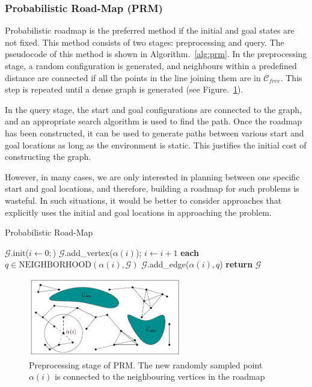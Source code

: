 \subsubsection{Probabilistic Road-Map (PRM)}
Probabilistic roadmap is the preferred method if the initial and goal states are not fixed. This method consists of two stages: preprocessing and query. The pseudocode of this method is shown in Algorithm.~\ref{alg:prm}.
In the preprocessing stage, a random configuration is generated, and neighbours within a predefined distance are connected if all the points in the line joining them are in $\mathcal{C}_{free}$. This step is repeated until a dense graph is generated (see Figure.~\ref{fig:prm}). 

In the query stage, the start and goal configurations are connected to the graph, and an appropriate search algorithm is used to find the path. Once the roadmap has been constructed, it can be used to generate paths between various start and goal locations as long as the environment is static. This justifies the initial cost of constructing the graph. 

However, in many cases, we are only interested in planning between one specific start and goal locations, and therefore, building a roadmap for such problems is wasteful. In such situations, it would be better to consider approaches that explicitly uses the initial and goal locations in approaching the problem.


\begin{algorithm}
\caption{Probabilistic Road-Map}\label{alg:prm}
\begin{algorithmic}[1]
\State $\mathcal{G}$.init($i\gets 0;$)
\State $\mathcal{G}$.add\_vertex($\alpha(i)$); $i\gets i+1$
\For \textbf{each} $q\in \text{NEIGHBORHOOD}(\alpha(i),\mathcal{G})$
\State $\mathcal{G}$.add\_edge($\alpha(i),q$)
\EndIf
\EndFor
\EndIf
\EndWhile
\State \textbf{return} $\mathcal{G}$
\end{algorithmic}
\end{algorithm}

\begin{figure}
\centering
\includegraphics[width=0.6\textwidth]{./images/prm}
\caption[Preprocessing stage of PRM]{Preprocessing stage of PRM. The new randomly sampled point $\alpha(i)$ is connected to the neighbouring vertices in the roadmap}
\label{fig:prm}
\end{figure}


